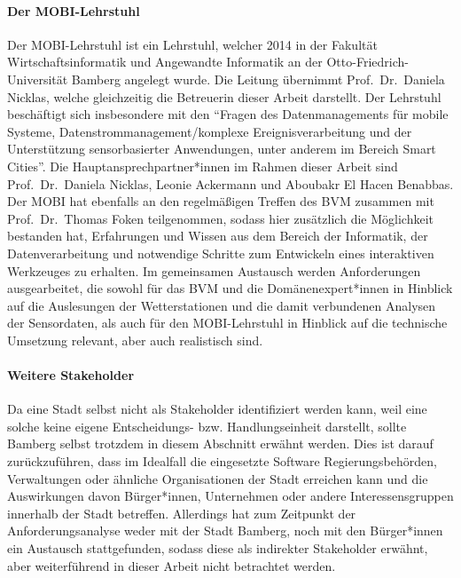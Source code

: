\paragraph{Der \ac{MOBI}-Lehrstuhl}
Der \ac{MOBI}-Lehrstuhl ist ein Lehrstuhl, welcher 2014 in der Fakultät Wirtschaftsinformatik und Angewandte Informatik an der Otto-Friedrich-Universität Bamberg angelegt wurde. Die Leitung übernimmt Prof.\ Dr.\ Daniela Nicklas, welche gleichzeitig die Betreuerin dieser Arbeit darstellt. Der Lehrstuhl beschäftigt sich insbesondere mit den \enquote{Fragen des Datenmanagements für mobile Systeme, Datenstrommanagement/komplexe Ereignisverarbeitung und der Unterstützung sensorbasierter Anwendungen, unter anderem im Bereich Smart Cities}. Die Hauptansprechpartner*innen im Rahmen dieser Arbeit sind Prof.\ Dr.\ Daniela Nicklas, Leonie Ackermann und Aboubakr El Hacen Benabbas. \\ Der MOBI hat ebenfalls an den regelmäßigen Treffen des \ac{BVM} zusammen mit Prof.\ Dr.\ Thomas Foken teilgenommen, sodass hier zusätzlich die Möglichkeit bestanden hat, Erfahrungen und Wissen aus dem Bereich der Informatik, der Datenverarbeitung und notwendige Schritte zum Entwickeln eines interaktiven Werkzeuges zu erhalten. Im gemeinsamen Austausch werden Anforderungen ausgearbeitet, die sowohl für das \ac{BVM} und die Domänenexpert*innen in Hinblick auf die Auslesungen der Wetterstationen und die damit verbundenen Analysen der Sensordaten, als auch für den \ac{MOBI}-Lehrstuhl in Hinblick auf die technische Umsetzung relevant, aber auch realistisch sind.

\paragraph{Weitere Stakeholder}
Da eine Stadt selbst nicht als Stakeholder identifiziert werden kann, weil eine solche keine eigene Entscheidungs- bzw. Handlungseinheit darstellt, sollte Bamberg selbst trotzdem in diesem Abschnitt erwähnt werden. Dies ist darauf zurückzuführen, dass im Idealfall die eingesetzte Software Regierungsbehörden, Verwaltungen oder ähnliche Organisationen der Stadt erreichen kann und die Auswirkungen davon Bürger*innen, Unternehmen oder andere Interessensgruppen innerhalb der Stadt betreffen. Allerdings hat zum Zeitpunkt der Anforderungsanalyse weder mit der Stadt Bamberg, noch mit den Bürger*innen ein Austausch stattgefunden, sodass diese als indirekter Stakeholder erwähnt, aber weiterführend in dieser Arbeit nicht betrachtet werden.

